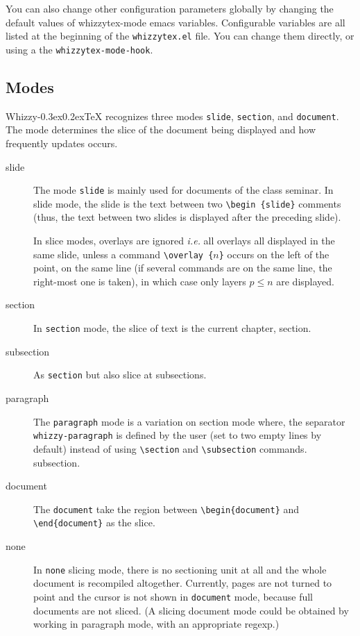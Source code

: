 \documentclass{article}
\makeatletter
\let \lst \verb
\def \whizzy {{Whizzy\kern -0.3ex\raise 0.2ex\hbox{\let \@\relax\TeX}}}
\makeatother
\begin{document}
You can also change other configuration parameters globally by changing the
default values of whizzytex-mode emacs variables. 
Configurable variables are all listed at the beginning of the
\lst"whizzytex.el" file. You can change them directly, or using a 
the \lst"whizzytex-mode-hook". 


\subsection {Modes} 
\label {modes}

{\whizzy} recognizes three modes \lst"slide", \lst"section", and \lst"document". 
The mode determines the slice of the document being displayed and how
frequently updates occurs. 
\begin{description}

\item [slide]

The mode \lst"slide"  is mainly used for documents of the class seminar. 
In slide mode, the slide is the text between two \lst"\begin {slide}"
comments (thus,  the text between two slides is displayed after the
preceding slide).  

In slice modes, overlays are ignored {\em i.e.} all overlays all displayed in
the same slide, unless a command
\lst"\overlay {"$n$\lst"}" occurs on the left of the point, on the same line
(if several commands are on the same line, the 
right-most one is taken), in which case only layers $p \le n$ are displayed.

\item [section]
In \lst"section" mode, the slice of text is the current chapter, section.

\item [subsection]
As \lst"section" but also slice at subsections. 

\item [paragraph]
The \lst"paragraph" mode is a variation on section mode where, the separator
\lst"whizzy-paragraph" is defined by the user (set to two empty lines by
default) instead of using \lst"\section"  and \lst"\subsection" commands. 
subsection.

\item [document]
The \lst"document" take the region between \lst"\begin{document}"
and \lst"\end"\lst"{document}" as the slice. 

\item [none]
In \lst"none" slicing mode, there is no sectioning unit at all and
the whole document is recompiled altogether. 
Currently, pages are not turned to point and the 
cursor is not shown in \lst"document" mode, because full documents are not
sliced. (A slicing document mode could be obtained by working in paragraph
mode, with an appropriate regexp.)

\end{description}
\end{document}
